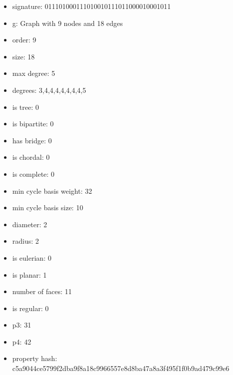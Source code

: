 \newpage
\begin{figure}
\end{figure}
\begin{itemize}
\item signature: 011101000111010010111011000010001011
\item g: Graph with 9 nodes and 18 edges
\item order: 9
\item size: 18
\item max degree: 5
\item degrees: 3,4,4,4,4,4,4,4,5
\item is tree: 0
\item is bipartite: 0
\item has bridge: 0
\item is chordal: 0
\item is complete: 0
\item min cycle basis weight: 32
\item min cycle basis size: 10
\item diameter: 2
\item radius: 2
\item is eulerian: 0
\item is planar: 1
\item number of faces: 11
\item is regular: 0
\item p3: 31
\item p4: 42
\item property hash: c5a9044ce5799f2dba9f8a18c9966557e8d8ba47a8a3f495f1f0b9ad479c99e6
\end{itemize}

